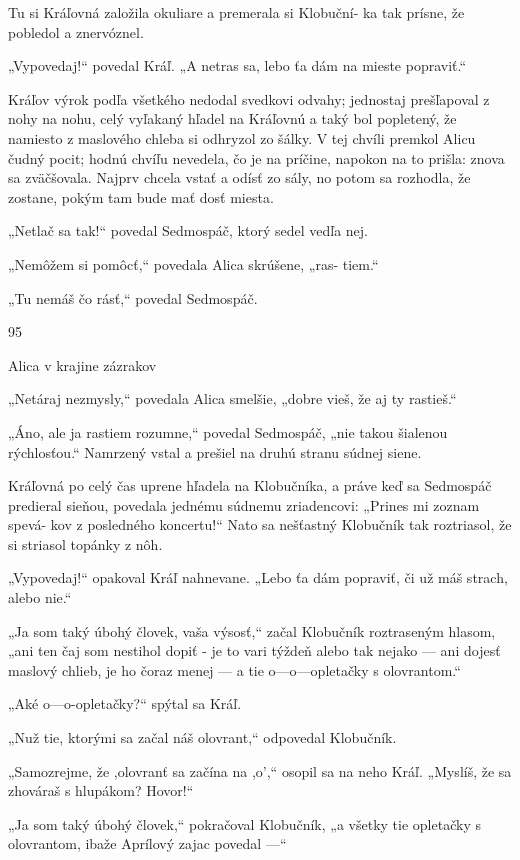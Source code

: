 \documentclass[12pt]{article}
\begin{document}
\begin{Parallel}[p]{}{}
{{Tu si Kráľovná založila okuliare a premerala si Klobuční-
ka tak prísne, že pobledol a znervóznel.

„Vypovedaj!“ povedal Kráľ. „A netras sa, lebo ťa dám
na mieste popraviť.“

Kráľov výrok podľa všetkého nedodal svedkovi odvahy;
jednostaj prešľapoval z nohy na nohu, celý vyľakaný hľadel
na Kráľovnú a taký bol popletený, že namiesto z maslového
chleba si odhryzol zo šálky. V tej chvíli premkol Alicu čudný
pocit; hodnú chvíľu nevedela, čo je na príčine, napokon na
to prišla: znova sa zväčšovala. Najprv chcela vstať a odísť zo
sály, no potom sa rozhodla, že zostane, pokým tam bude mať
dosť miesta.

„Netlač sa tak!“ povedal Sedmospáč, ktorý sedel vedľa
nej.

„Nemôžem si pomôcť,“ povedala Alica skrúšene, „ras-
tiem.“

„Tu nemáš čo rásť,“ povedal Sedmospáč.

95

Alica v krajine zázrakov

„Netáraj nezmysly,“ povedala Alica smelšie, „dobre vieš,
že aj ty rastieš.“

„Áno, ale ja rastiem rozumne,“ povedal Sedmospáč, „nie
takou šialenou rýchlosťou.“ Namrzený vstal a prešiel na
druhú stranu súdnej siene.

Kráľovná po celý čas uprene hľadela na Klobučníka,
a práve keď sa Sedmospáč predieral sieňou, povedala
jednému súdnemu zriadencovi: „Prines mi zoznam spevá-
kov z posledného koncertu!“ Nato sa nešťastný Klobučník
tak roztriasol, že si striasol topánky z nôh.

„Vypovedaj!“ opakoval Kráľ nahnevane. „Lebo ťa dám
popraviť, či už máš strach, alebo nie.“

„Ja som taký úbohý človek, vaša výsosť,“ začal Klobučník
roztraseným hlasom, „ani ten čaj som nestihol dopiť - je to
vari týždeň alebo tak nejako — ani dojesť maslový chlieb, je
ho čoraz menej — a tie o—o—opletačky s olovrantom.“

„Aké o—o-opletačky?“ spýtal sa Kráľ.

„Nuž tie, ktorými sa začal náš olovrant,“ odpovedal
Klobučník.

„Samozrejme, že ,olovranť sa začína na ,o',“ osopil sa na
neho Kráľ. „Myslíš, že sa zhováraš s hlupákom? Hovor!“

„Ja som taký úbohý človek,“ pokračoval Klobučník, „a
všetky tie opletačky s olovrantom, ibaže Aprílový zajac
povedal —“

}}
\end{Parallel}
\end{document}
